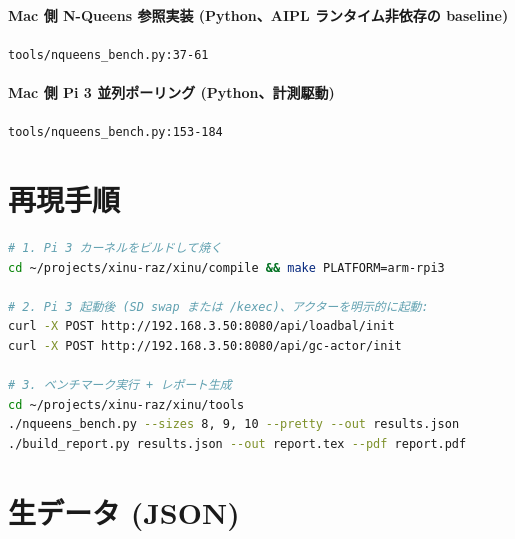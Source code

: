 \documentclass[a4paper,11pt]{ltjsarticle}
\begin{document}
\paragraph{Mac 側 N-Queens 参照実装 (Python、AIPL ランタイム非依存の baseline)} \hfill
\texttt{tools/nqueens\_bench.py:37-61}


\paragraph{Mac 側 Pi 3 並列ポーリング (Python、計測駆動)} \hfill
\texttt{tools/nqueens\_bench.py:153-184}



\section{再現手順}

\begin{lstlisting}[language=bash]
# 1. Pi 3 カーネルをビルドして焼く
cd ~/projects/xinu-raz/xinu/compile && make PLATFORM=arm-rpi3

# 2. Pi 3 起動後 (SD swap または /kexec)、アクターを明示的に起動:
curl -X POST http://192.168.3.50:8080/api/loadbal/init
curl -X POST http://192.168.3.50:8080/api/gc-actor/init

# 3. ベンチマーク実行 + レポート生成
cd ~/projects/xinu-raz/xinu/tools
./nqueens_bench.py --sizes 8, 9, 10 --pretty --out results.json
./build_report.py results.json --out report.tex --pdf report.pdf
\end{lstlisting}

\section{生データ (JSON)}
\end{document}

